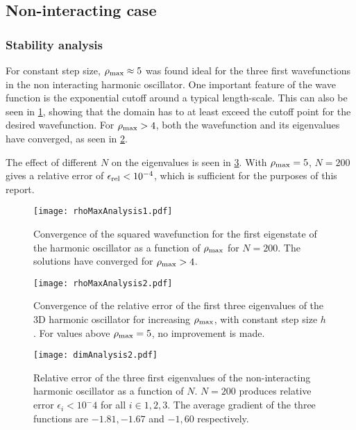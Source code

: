 \subsection{Non-interacting case}
\subsubsection{Stability analysis}

For constant step size, $\rho_{\text{max}} \approx 5$ was found ideal for the
three first wavefunctions in the non interacting harmonic oscillator.  One
important feature of the wave function is the exponential cutoff around a
typical length-scale. This can also be seen in \cref{fig:rhoMax1}, showing
that the domain has to at least exceed the cutoff point for the desired
wavefunction. For $\rho_{\text{max}} > 4$, both the wavefunction and its
eigenvalues have converged, as seen in \cref{fig:rhoMax2}.  

The effect of different $N$ on the eigenvalues is seen in
\cref{fig:dim2}. With $\rho_{\text{max}} = 5$, $N = 200$ gives a relative
error of $\epsilon_{\text{rel}} < 10^{-4}$, which is sufficient for the purposes of this
report.

\begin{figure}[H]
    \centering
    \texttt{[image: rhoMaxAnalysis1.pdf]}
    \caption{Convergence of the squared wavefunction for the first
        eigenstate of the harmonic oscillator as a function of $\rho_{\text{max}}$
    for $N=200$. The solutions have converged for $\rho_{\text{max}} > 4$.}
    \label{fig:rhoMax1}
\end{figure}

\begin{figure}[H]
    \centering
    \texttt{[image: rhoMaxAnalysis2.pdf]}
    \caption{Convergence of the relative error of the first three
        eigenvalues of the 3D harmonic oscillator for increasing $\rho_{\text{max}}$,
        with constant step size $h$. For values above $\rho_{\text{max}} = 5$, no
    improvement is made.}
    \label{fig:rhoMax2}
\end{figure}


\begin{figure}[H]
    \centering
    \texttt{[image: dimAnalysis2.pdf]}
    \caption{Relative error of the three first eigenvalues of the
    non-interacting harmonic oscillator as a function of $N$. $N=200$
produces relative error $\epsilon_i < 10^-4$ for all $i\in{1,2,3}$. The
average gradient of the three functions are $-1.81, -1.67$ and $ -1,60$
respectively.} 
    \label{fig:dim2}
\end{figure}

